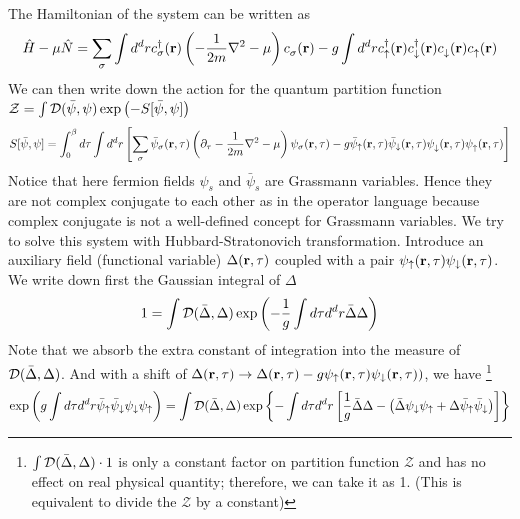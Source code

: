   The Hamiltonian of the system can be written as   
\begin{equation}
\hat{H}-\mu\hat{N}=\sum_{\sigma}\int{d^{d}r}c^{\dagger}_{\sigma}(\mathbf{r})\left(-\frac{1}{2m}\nabla^{2}-\mu\right)c^{}_{\sigma}(\mathbf{r})-g\int{d^{d}r}c^{\dagger}_{\uparrow}(\mathbf{r})c^{\dagger}_{\downarrow}(\mathbf{r})c^{}_{\downarrow}(\mathbf{r})c^{}_{\uparrow}(\mathbf{r})
\end{equation}
 We can then write down the action for the quantum partition function $\mathcal{Z}=\int{\ensuremath{\mathcal{D}}(\bar\psi,\psi)\exp\ensuremath{\left(-S[\bar\psi,\psi]\right)}}$
\begin{equation}\label{eq:pathInt2:actionPsi}
S[\bar\psi,\psi]=\int^{\beta}_{0}d\tau\int{d^{d}r}\left[\sum_{\sigma}\bar\psi_{\sigma}(\mathbf{r},\tau)\left(\partial_{\tau}-\frac{1}{2m}\nabla^{2}-\mu\right)\psi_{\sigma}(\mathbf{r},\tau)-g\bar\psi_{\uparrow}(\mathbf{r},\tau)\bar\psi_{\downarrow}(\mathbf{r},\tau)\psi^{}_{\downarrow}(\mathbf{r},\tau)\psi^{}_{\uparrow}(\mathbf{r},\tau)\right]
\end{equation}
Notice that here fermion fields $\psi_{s}$ and $\bar\psi_{s}$ are Grassmann variables. Hence  they are not complex conjugate to each other as in the operator language because  complex conjugate is not a well-defined concept for Grassmann variables. 
We try to solve this system with Hubbard-Stratonovich transformation.   Introduce an auxiliary field (functional variable) $\Delta(\mathbf{r},\tau)$ coupled with a pair $\psi_{\uparrow}(\mathbf{r},\tau)\psi_{\downarrow}(\mathbf{r},\tau)$. %
We write down first the Gaussian integral of $\Delta$
\begin{equation}
1=\int{\ensuremath{\mathcal{D}}(\bar\Delta,\Delta)}\exp\left(-\frac{1}{g}\int{d\tau{d}^{d}r}\bar\Delta\Delta\right)
\end{equation}
Note that we absorb the extra constant of integration into the measure of $\mathcal{D}(\bar\Delta,\Delta)$.
And with a shift of $\Delta(\mathbf{r},\tau)\rightarrow\Delta(\mathbf{r},\tau)-g\psi_{\uparrow}(\mathbf{r},\tau)\psi_{\downarrow}(\mathbf{r},\tau))$, we have 
\footnote{$\int{\ensuremath{\mathcal{D}}(\bar\Delta,\Delta)}\cdot1$ is only a constant factor on partition function $\mathcal{Z}$ and has no effect on real physical quantity; therefore, we can take it as 1. (This is equivalent to  divide the $\mathcal{Z}$ by a constant)}
\begin{equation}\label{eq:pathInt:expHS}
\exp\left(g\int{d\tau{}d^{d}r}\bar{\psi}_{\uparrow}\bar\psi_{\downarrow}\psi_{\downarrow}\psi_{\uparrow}\right)=
\int{\ensuremath{\mathcal{D}}(\bar\Delta,\Delta)}\exp\left\{-\int{d\tau{d^{d}r}}\left[\frac{1}{g}{\bar\Delta}{\Delta}-\left(\bar\Delta\psi_{\downarrow}\psi_{\uparrow}+\Delta\bar\psi_{\uparrow}\bar\psi_{\downarrow}\right)\right]\right\}
\end{equation}
